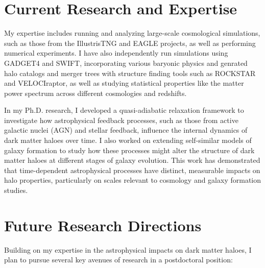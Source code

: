 \documentclass[12pt]{article}
\begin{document}
\section*{Current Research and Expertise}
My expertise includes running and analyzing large-scale cosmological simulations, such as those from the IllustrisTNG and EAGLE projects, as well as performing numerical experiments. I have also independently run simulations using GADGET4 and SWIFT, incorporating various baryonic physics and genrated halo catalogs and merger trees with structure finding tools such as ROCKSTAR and VELOCIraptor, as well as studying statistical properties like the matter power spectrum across different cosmologies and redshifts.

In my Ph.D. research, I developed a quasi-adiabatic relaxation framework to investigate how astrophysical feedback processes, such as those from active galactic nuclei (AGN) and stellar feedback, influence the internal dynamics of dark matter haloes over time. I also worked on extending self-similar models of galaxy formation to study how these processes might alter the structure of dark matter haloes at different stages of galaxy evolution. This work has demonstrated that time-dependent astrophysical processes have distinct, measurable impacts on halo properties, particularly on scales relevant to cosmology and galaxy formation studies.

\section*{Future Research Directions}
Building on my expertise in the astrophysical impacts on dark matter haloes, I plan to pursue several key avenues of research in a postdoctoral position:
\end{document}

